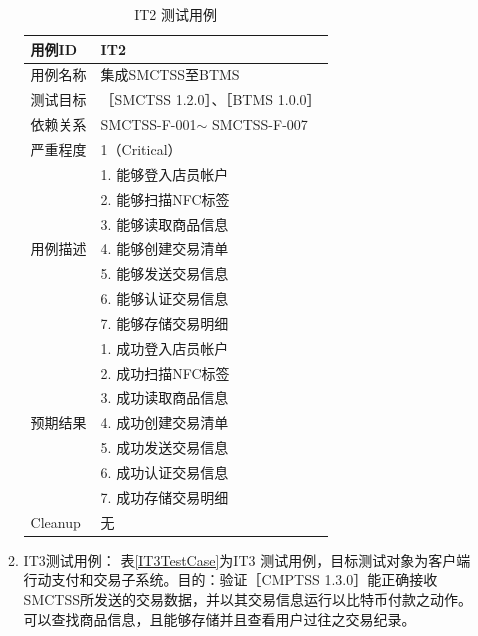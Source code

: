 \begin{enumerate}
\begin{enumerate}
						\begin{table}[!htbp]
						\caption{IT2 测试用例} %
						\centering %
						\label{IT2TestCase} %
						\begin{tabular}{|l|l|}
						\hline
						用例ID & IT2 \\ \hline
						用例名称 & 集成SMCTSS至BTMS \\ \hline
						测试目标 & {［}SMCTSS 1.2.0{］}、{［}BTMS 1.0.0{］} \\ \hline
						依赖关系 & SMCTSS-F-001$\sim$ SMCTSS-F-007 \\ \hline
						严重程度 & 1（Critical） \\ \hline
						\multirow{7}{*}{用例描述} & 1.     能够登入店员帐户 \\ \cline{2-2} 
						 & 2.     能够扫描NFC标签 \\ \cline{2-2} 
						 & 3.     能够读取商品信息 \\ \cline{2-2} 
						 & 4.     能够创建交易清单 \\ \cline{2-2} 
						 & 5.     能够发送交易信息 \\ \cline{2-2} 
						 & 6.     能够认证交易信息 \\ \cline{2-2} 
						 & 7.     能够存储交易明细 \\ \hline
						\multirow{7}{*}{预期结果} & 1.     成功登入店员帐户 \\ \cline{2-2} 
						 & 2.     成功扫描NFC标签 \\ \cline{2-2} 
						 & 3.     成功读取商品信息 \\ \cline{2-2} 
						 & 4.     成功创建交易清单 \\ \cline{2-2} 
						 & 5.     成功发送交易信息 \\ \cline{2-2} 
						 & 6.     成功认证交易信息 \\ \cline{2-2} 
						 & 7.     成功存储交易明细 \\ \hline
						Cleanup & 无 \\ \hline
						\end{tabular}
						\end{table}

				\item IT3测试用例：
					表\ref{IT3TestCase}为IT3 测试用例，目标测试对象为客户端行动支付和交易子系统。目的：验证［CMPTSS 1.3.0］能正确接收SMCTSS所发送的交易数据，并以其交易信息运行以比特币付款之动作。可以查找商品信息，且能够存储并且查看用户过往之交易纪录。


\end{enumerate}
\end{enumerate}
